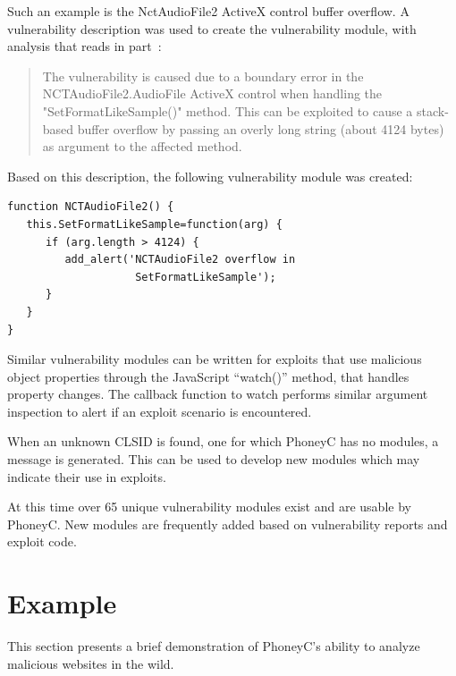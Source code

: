 \documentclass[10pt,twocolumn]{article}
\begin{document}
Such an example is the NctAudioFile2 ActiveX control buffer overflow. A vulnerability description was used to create the vulnerability module, with analysis that reads in part~\cite{secunia:nctaudiofile}:
\begin{quote}
The vulnerability is caused due to a boundary error in the NCTAudioFile2.AudioFile ActiveX control when handling the "SetFormatLikeSample()" method. This can be exploited to cause a stack-based buffer overflow by passing an overly long string (about 4124 bytes) as argument to the affected method.
\end{quote}
Based on this description, the following vulnerability module was created:
\scriptsize
\begin{verbatim}
function NCTAudioFile2() {
   this.SetFormatLikeSample=function(arg) {
      if (arg.length > 4124) {
         add_alert('NCTAudioFile2 overflow in 
                    SetFormatLikeSample');
      }
   }
}
\end{verbatim}
\normalsize
Similar vulnerability modules can be written for exploits that use malicious object properties through the JavaScript ``watch()'' method, that handles property changes. The callback function to watch performs similar argument inspection to alert if an exploit scenario is encountered.

When an unknown CLSID is found, one for which PhoneyC has no modules, a message is generated. This can be used to develop new modules which may indicate their use in exploits. 

At this time over 65 unique vulnerability modules exist and are usable by PhoneyC. New modules are frequently added based on vulnerability reports and exploit code. 

\section{Example}
\label{example}

This section presents a brief demonstration of PhoneyC's ability to analyze malicious websites in the wild.
\end{document}
